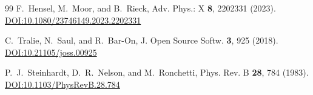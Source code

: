 \documentclass[twocolumn,showpacs,preprintnumbers,amsmath,amssymb,prb,floatfix]{revtex4-2}
\begin{document}
\begin{thebibliography}{99}
F.~Hensel, M.~Moor, and B.~Rieck, Adv. Phys.: X \textbf{8}, 2202331 (2023). \href{https://doi.org/10.1080/23746149.2023.2202331}{DOI:10.1080/23746149.2023.2202331}

C.~Tralie, N.~Saul, and R.~Bar-On, J. Open Source Softw. \textbf{3}, 925 (2018). \href{https://doi.org/10.21105/joss.00925}{DOI:10.21105/joss.00925}

P.~J.~Steinhardt, D.~R.~Nelson, and M.~Ronchetti, Phys. Rev. B \textbf{28}, 784 (1983). \href{https://doi.org/10.1103/PhysRevB.28.784}{DOI:10.1103/PhysRevB.28.784}

\end{thebibliography}
\end{document}
